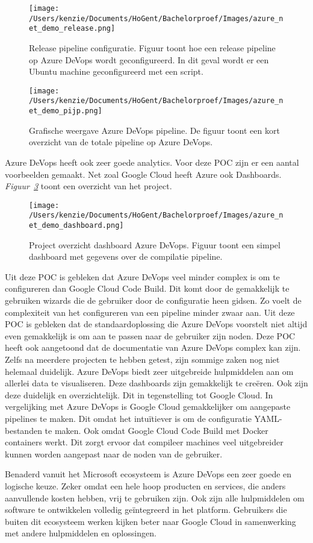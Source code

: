 \begin{figure}[!htbp]
    \centering
    \texttt{[image: /Users/kenzie/Documents/HoGent/Bachelorproef/Images/azure\_net\_demo\_release.png]}
    \caption{Release pipeline configuratie. Figuur toont hoe een release pipeline op Azure DeVops wordt geconfigureerd. In dit geval wordt er een Ubuntu machine geconfigureerd met een script.}
    \label{fig:Azure_POC_release}
\end{figure}

\begin{figure}[!htbp]
    \centering
    \texttt{[image: /Users/kenzie/Documents/HoGent/Bachelorproef/Images/azure\_net\_demo\_pijp.png]}
    \caption{Grafische weergave Azure DeVops pipeline. De figuur toont een kort overzicht van de totale pipeline op Azure DeVops.}
    \label{fig:Azure_POC_pijp}
\end{figure}

Azure DeVops heeft ook zeer goede analytics. Voor deze POC zijn er een aantal voorbeelden gemaakt. Net zoal Google Cloud heeft Azure ook Dashboards. \emph{Figuur~\ref{fig:Azure_POC_dashboard}} toont een overzicht van het project.

\begin{figure}[!htbp]
    \centering
    \texttt{[image: /Users/kenzie/Documents/HoGent/Bachelorproef/Images/azure\_net\_demo\_dashboard.png]}
    \caption{Project overzicht dashboard Azure DeVops. Figuur toont een simpel dashboard met gegevens over de compilatie pipeline.}
    \label{fig:Azure_POC_dashboard}
\end{figure}

Uit deze POC is gebleken dat Azure DeVops veel minder complex is om te configureren dan Google Cloud Code Build. Dit komt door de gemakkelijk te gebruiken wizards die de gebruiker door de configuratie heen gidsen. Zo voelt de complexiteit van het configureren van een pipeline minder zwaar aan. Uit deze POC is gebleken dat de standaardoplossing die Azure DeVops voorstelt niet altijd even gemakkelijk is om aan te passen naar de gebruiker zijn noden. Deze POC heeft ook aangetoond dat de documentatie van Azure DeVops complex kan zijn. Zelfs na meerdere projecten te hebben getest, zijn sommige zaken nog niet helemaal duidelijk. Azure DeVops biedt zeer uitgebreide hulpmiddelen aan om allerlei data te visualiseren. Deze dashboards zijn gemakkelijk te creëren. Ook zijn deze duidelijk en overzichtelijk. Dit in tegenstelling tot Google Cloud. In vergelijking met Azure DeVops is Google Cloud gemakkelijker om aangepaste pipelines te maken. Dit omdat het intuïtiever is om de configuratie YAML-bestanden te maken. Ook omdat Google Cloud Code Build met Docker containers werkt. Dit zorgt ervoor dat compileer machines veel uitgebreider kunnen worden aangepast naar de noden van de gebruiker.

Benaderd vanuit het Microsoft ecosysteem is Azure DeVops een zeer goede en logische keuze. Zeker omdat een hele hoop producten en services, die anders aanvullende kosten hebben, vrij te gebruiken zijn. Ook zijn alle hulpmiddelen om software te ontwikkelen volledig geïntegreerd in het platform. Gebruikers die buiten dit ecosysteem werken kijken beter naar Google Cloud in samenwerking met andere hulpmiddelen en oplossingen.